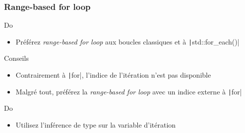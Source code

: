 \documentclass[C++.tex]{subfiles}
\begin{document}
\begin{frame}
	\frametitle{Range-based for loop}
	\begin{exampleblock}{Do}
		\begin{itemize}
			\item Préférez \textit{range-based for loop} aux boucles classiques et à \texttt|std::for_each()|
		\end{itemize}
	\end{exampleblock}


	\begin{block}{Conseils}
		\begin{itemize}
			\item Contrairement à \texttt|for|, l'indice de l'itération n'est pas disponible
			\item Malgré tout, préférez la \textit{range-based for loop} avec un indice externe à \texttt|for|
		\end{itemize}
	\end{block}

	\begin{exampleblock}{Do}
		\begin{itemize}
			\item Utilisez l'inférence de type sur la variable d'itération
		\end{itemize}
	\end{exampleblock}
\end{frame}
\end{document}
